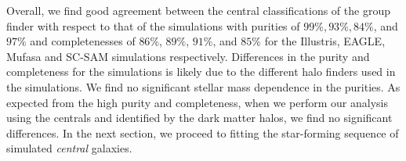 \documentclass[tighten, preprint]{aastex62}
\begin{document}
Overall, we find good agreement between the central classifications of 
the group finder with respect to that of the simulations %
 with purities of
$99\%, 93\%, 84\%$, and $97\%$ and completenesses of $86\%$, $89\%$, 
$91\%$, and $85\%$ for the Illustris, EAGLE, {\sc Mufasa} and SC-SAM 
simulations respectively. Differences in the purity and completeness for the 
simulations is likely due to the different halo finders used in the 
simulations. %
We find no significant stellar mass dependence in the purities. %
As expected from the high purity and completeness, when we perform our 
analysis using the centrals and identified by the dark matter halos, we 
find no significant differences. %
In the next section, we proceed to fitting the star-forming sequence 
of simulated \emph{central} galaxies. %
\end{document}
